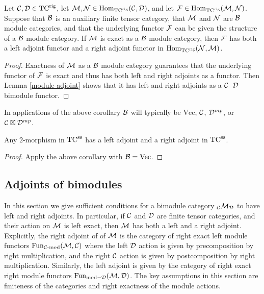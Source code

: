 \documentclass{amsart}
\begin{document}
\begin{corollary}
Let $\mathcal C, \mathcal D \in {\mathrm{TC}^{\text{rig}}}$, let $\mathcal M, \mathcal N \in \operatorname{Hom}_{\mathrm{TC}^{\text{rig}}}(\mathcal C,\mathcal D)$, and let $\mathcal F \in \operatorname{Hom}_{{\mathrm{TC}^{\text{rig}}}}(\mathcal M,\mathcal N)$.  Suppose that $\mathcal B$ is an auxiliary finite tensor category, that $\mathcal M$ and $\mathcal N$ are $\mathcal B$ module categories, and that the underlying functor $\mathcal F$ can be given the structure of a $\mathcal B$ module category.  If $\mathcal M$ is exact as a $\mathcal B$ module category, then $\mathcal F$ has both a left adjoint functor and a right adjoint functor in $\operatorname{Hom}_{{\mathrm{TC}^{\text{rig}}}}(\mathcal N,\mathcal M)$.  
\end{corollary}
\begin{proof}
Exactness of $\mathcal M$ as a $\mathcal B$ module category guarantees that the underlying functor of $\mathcal F$ is exact and thus has both left and right adjoints as a functor.  Then Lemma \ref{module-adjoint} shows that it has left and right adjoints as a $\mathcal C$--$\mathcal D$ bimodule functor.
\end{proof}

\begin{remark}
In applications of the above corollary $\mathcal B$ will typically be $\mathrm{Vec}$, $\mathcal C$, $\mathcal D^{mp}$, or $\mathcal C \boxtimes \mathcal D^{mp}$.
\end{remark}

\begin{corollary}
Any $2$-morphism in ${\mathrm{TC}^{\text{ss}}}$ has a left adjoint and a right adjoint in ${\mathrm{TC}^{\text{ss}}}$.
\end{corollary}
\begin{proof}
Apply the above corollary with $\mathcal B = \mathrm{Vec}$.
\end{proof}

\subsection{Adjoints of bimodules}  \label{sec-df-modules}

In this section we give sufficient conditions for a  bimodule category ${}_\mathcal C \mathcal M_\mathcal D$ to have left and right adjoints.  In particular, if $\mathcal C$ and $\mathcal D$ are finite tensor categories, and their action on $\mathcal M$ is left exact, then $\mathcal M$ has both a left and a right adjoint.  Explicitly, the right adjoint of of $\mathcal M$ is the category of right exact left module functors $\operatorname{Fun}_{\mathcal C\text{-mod}}(\mathcal M, \mathcal C)$ where the left $\mathcal D$ action is given by precomposition by right multiplication, and the right $\mathcal C$ action is given by postcomposition by right multiplication.  Similarly, the left adjoint is given by the category of right exact right module functors $\operatorname{Fun}_{\text{mod}-\mathcal D}(\mathcal M, \mathcal D)$.  The key assumptions in this section are finiteness of the categories and right exactness of the module actions.
\end{document}
